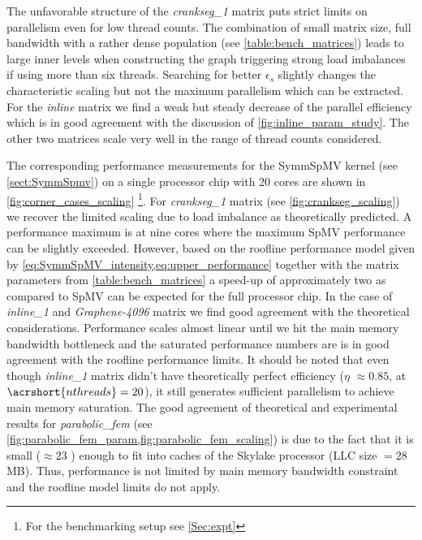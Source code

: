 The unfavorable structure of the \emph{crankseg\_1} matrix puts strict limits on parallelism even for low thread counts.  The combination of small matrix size, full bandwidth with a rather dense population (see \cref{table:bench_matrices}) leads to large inner levels when constructing the graph triggering strong load imbalances if using more than six threads. Searching for better $\epsilon_s$ slightly changes the characteristic scaling but not the maximum parallelism which can be extracted. For the \emph{inline} matrix we find a weak but steady decrease of the parallel efficiency which is in good agreement with the discussion of \cref{fig:inline_param_study}. The other two matrices scale very well in the range of thread counts considered. 

The corresponding performance measurements for the \acrshort{SymmSpMV} kernel (see \cref{sect:SymmSpmv}) on a single \SKX processor chip with 20 cores are shown in \cref{fig:corner_cases_scaling} \footnote{For the benchmarking setup see \cref{Sec:expt}}. 
For \emph{crankseg\_1} matrix (see \cref{fig:crankseg_scaling}) we recover the limited scaling due to load imbalance as theoretically predicted. A performance maximum is at nine cores where the maximum \acrshort{SpMV} performance can be slightly exceeded. However, based on the roofline performance model given by \cref{eq:SymmSpMV_intensity,eq:upper_performance} together with the matrix parameters from \cref{table:bench_matrices} a speed-up of approximately two as compared to \acrshort{SpMV} can be expected for the full processor chip. 
In the case of \emph{inline\_1} and \emph{Graphene-4096} matrix we find good agreement with the theoretical considerations. Performance scales almost linear until we hit the main memory bandwidth bottleneck and the saturated performance numbers are is in good agreement with the roofline performance limits.  
It should be noted that even though \emph{inline\_1} matrix didn't have theoretically perfect efficiency ($\eta$ $\approx 0.85$, at $\acrshort{nthreads}=20$), it still generates sufficient parallelism to achieve main memory saturation. 
The good agreement of theoretical and experimental results for  \emph{parabolic\_fem}  (see \cref{fig:parabolic_fem_param,fig:parabolic_fem_scaling}) is due to the fact that it is small ($\approx 23$ \MB) enough to fit into caches of the Skylake processor (\acrshort{LLC} size $= 28$ MB). Thus, performance is not limited by main memory bandwidth constraint and the roofline model limits do not apply.

